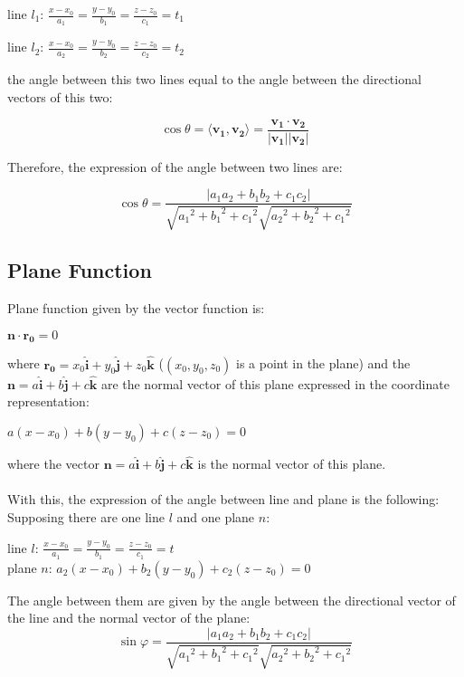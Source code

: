 \documentclass[UTF8,a4paper, 10pt, openany]{svmono}
\begin{document}
\begin{center}
line $l_1$: $\frac{x-x_0}{a_1}=\frac{y-y_0}{b_1}=\frac{z-z_0}{c_1}=t_1$

line $l_2$: $\frac{x-x_0}{a_2}=\frac{y-y_0}{b_2}=\frac{z-z_0}{c_2}=t_2$
\end{center}

the angle between this two lines equal to the angle between the directional vectors of this two:

\[\cos \theta = \langle \mathbf{v_1},\mathbf{v_2} \rangle =\frac{\mathbf{v_1}\cdot \mathbf{v_2}}{|\mathbf{v_1}||\mathbf{v_2}|}\]

Therefore, the expression of the angle between two lines are:

\begin{equation}
\boxed{\cos \theta =\frac{|a_1a_2+b_1b_2+c_1c_2|}{\sqrt{{a_1}^2+{b_1}^2+{c_1}^2}\sqrt{{a_2}^2+{b_2}^2+{c_1}^2}}}
\end{equation}



\subsection{Plane Function}
Plane function given by the vector function is:
\begin{center}
$\mathbf{n}\cdot \mathbf{r_0}=0$\\
\end{center}
where $\mathbf{r_0}=x_0\mathbf{\hat{i}}+y_0\mathbf{\hat{j}}+z_0\mathbf{\hat{k}}$ ($(x_0,y_0,z_0)$ is a point in the plane) and the $\mathbf{n}=a\mathbf{\hat{i}}+b\mathbf{\hat{j}}+c\mathbf{\hat{k}}$ are the normal vector of this plane
expressed in the coordinate representation:
\begin{center}
$a(x-x_0)+b(y-y_0)+c(z-z_0)=0$
\end{center}
where the vector $\mathbf{n}=a\mathbf{\hat{i}}+b\mathbf{\hat{j}}+c\mathbf{\hat{k}}$ is the normal vector of this plane.\\ \\
With this, the expression of the angle between line and plane is the following:\\
Supposing there are one line $l$ and one plane $n$:
\begin{center}
line $l$: $\frac{x-x_0}{a_1}=\frac{y-y_0}{b_1}=\frac{z-z_0}{c_1}=t$\\
plane $n$: $a_2(x-x_0)+b_2(y-y_0)+c_2(z-z_0)=0$
\end{center}
The angle between them are given by the angle between the directional vector of the line and the normal vector of the plane:
\begin{equation}
\boxed{\sin \varphi =\frac{|a_1a_2+b_1b_2+c_1c_2|}{\sqrt{{a_1}^2+{b_1}^2+{c_1}^2}\sqrt{{a_2}^2+{b_2}^2+{c_1}^2}}}
\end{equation}
\end{document}
